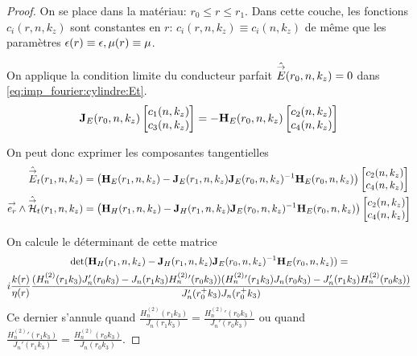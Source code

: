     \begin{proof}
      On se place dans la matériau: \(r_0 \le r \le r_ 1 \). Dans cette couche, les fonctions \(c_i(r,n,k_z)\) sont constantes en \(r\): \(c_i(r,n,k_z) \equiv c_i(n,k_z)\) de même que les paramètres \(\epsilon(r)\equiv \epsilon, \mu(r)\equiv \mu\).

      On applique la condition limite du conducteur parfait \(\hat {{\overset{\rightarrow}{E}}}(r_0,n,k_z) = 0\) dans \eqref{eq:imp_fourier:cylindre:Et}.
      \begin{equation*}
        \mathbf{J}_{E}(r_0,n,k_z)
        \begin{bmatrix}
          c_1(n,k_z) \\
          c_3(n,k_z)
        \end{bmatrix}
        =-\mathbf{H}_{E}(r_0,n,k_z)
        \begin{bmatrix}
          c_2(n,k_z) \\
          c_4(n,k_z)
        \end{bmatrix}
      \end{equation*}

      On peut donc exprimer les composantes tangentielles%
      \begin{align*}
        \hat {{\overset{\rightarrow}{E}}}_t(r_1,n,k_z) &=
        \left(\mathbf{H}_{E}(r_1,n,k_z) - \mathbf{J}_{E}(r_1,n,k_z)\mathbf{J}_{E}(r_0,n,k_z)^{-1}\mathbf{H}_{E}(r_0,n,k_z)\right)
        \begin{bmatrix}
          c_2(n,k_z) \\
          c_4(n,k_z)
        \end{bmatrix}
        \\
        {\overset{\rightarrow}{e_r}}\wedge \hat {{\overset{\rightarrow}{\mathcal{H}}}}_t(r_1,n,k_z) &=
        \left(\mathbf{H}_{H}(r_1,n,k_z) - \mathbf{J}_{H}(r_1,n,k_z)\mathbf{J}_{E}(r_0,n,k_z)^{-1}\mathbf{H}_{E}(r_0,n,k_z) \right)
        \begin{bmatrix}
          c_2(n,k_z) \\
          c_4(n,k_z)
        \end{bmatrix}
      \end{align*}

      On calcule le déterminant de cette matrice 
      \begin{multline*}
        \det(\mathbf{H}_{H}(r_1,n,k_z) - \mathbf{J}_{H}(r_1,n,k_z)\mathbf{J}_{E}(r_0,n,k_z)^{-1}\mathbf{H}_{E}(r_0,n,k_z)) = \\
        i\dfrac{k(r)}{\eta(r)}\dfrac{(H_n^{(2)}(r_1k_3)J_n'(r_0k_3)-J_n(r_1k_3)H_n^{(2)}{}'(r_0k_3))(H_n^{(2)}{}'(r_1k_3)J_n(r_0k_3)-J_n'(r_1k_3)H_n^{(2)}(r_0k_3))}{J_n'(r_0^+k_3)J_n(r_0^+k_3)}
      \end{multline*}
      Ce dernier s'annule quand \(\frac{H_n^{(2)}(r_1k_3)}{J_n(r_1k_3)} = \frac{H_n^{(2)}{}'(r_0k_3)}{J_n'(r_0k_3)}\) ou quand \(\frac{H_n^{(2)}{}'(r_1k_3)}{J_n'(r_1k_3)} = \frac{H_n^{(2)}(r_0k_3)}{J_n(r_0k_3)}\).


\end{proof}
